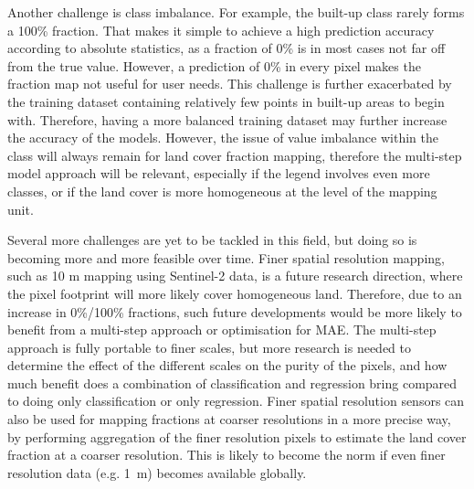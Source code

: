 \documentclass[review,authoryear,3p]{elsarticle}
\begin{document}
Another challenge is class imbalance.
For example, the built-up class rarely forms a 100\% fraction.
That makes it simple to achieve a high prediction accuracy according to absolute statistics, as a fraction of 0\% is in most cases not far off from the true value.
However, a prediction of 0\% in every pixel makes the fraction map not useful for user needs.
This challenge is further exacerbated by the training dataset containing relatively few points in built-up areas to begin with.
Therefore, having a more balanced training dataset may further increase the accuracy of the models.
However, the issue of value imbalance within the class will always remain for land cover fraction mapping, therefore the multi-step model approach will be relevant, especially if the legend involves even more classes, or if the land cover is more homogeneous at the level of the mapping unit.

Several more challenges are yet to be tackled in this field, but doing so is becoming more and more feasible over time.
%
Finer spatial resolution mapping, such as 10 m mapping using Sentinel-2 data, is a future research direction, where the pixel footprint will more likely cover homogeneous land.
Therefore, due to an increase in 0\%/100\% fractions, such future developments would be more likely to benefit from a multi-step approach or optimisation for \gls{MAE}.
The multi-step approach is fully portable to finer scales, but more research is needed to determine the effect of the different scales on the purity of the pixels, and how much benefit does a combination of classification and regression bring compared to doing only classification or only regression.
Finer spatial resolution sensors can also be used for mapping fractions at coarser resolutions in a more precise way, by performing aggregation of the finer resolution pixels to estimate the land cover fraction at a coarser resolution.
This is likely to become the norm if even finer resolution data (e.g. 1~m) becomes available globally.
\end{document}
